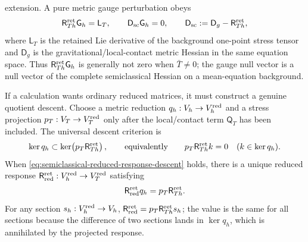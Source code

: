 \begin{controlledapproximation}
extension.  A pure metric gauge perturbation obeys
\begin{equation}
  \mathsf R^{\rm ret}_{Th}\mathsf G_h=\mathsf L_T,
  \qquad
  \mathsf D_{\rm sc}\mathsf G_h=0,
  \qquad
  \mathsf D_{\rm sc}:=\mathsf D_g-\mathsf R^{\rm ret}_{Th},
  \label{eq:semiclassical-typed-gauge-response}
\end{equation}
where \(\mathsf L_T\) is the retained Lie derivative of the background
one-point stress tensor and \(\mathsf D_g\) is the gravitational/local-contact
metric Hessian in the same equation space.  Thus
\(\mathsf R^{\rm ret}_{Th}\mathsf G_h\) is generally not zero when
\(\bar T\ne0\); the gauge null vector is a null vector of the complete
semiclassical Hessian on a mean-equation background.

If a calculation wants ordinary reduced matrices, it must construct a genuine
quotient descent.  Choose a metric reduction
\(q_h:V_h\to V_h^{\rm red}\) and a stress projection
\(p_T:V_T\to V_T^{\rm red}\) only after the local/contact term
\(\mathsf Q_T\) has been included.  The universal descent criterion is
\begin{equation}
  \ker q_h
  \subset
  \ker\!\left(p_T\mathsf R^{\rm ret}_{Th}\right),
  \qquad\text{equivalently}\qquad
  p_T\mathsf R^{\rm ret}_{Th}k=0
  \quad(k\in\ker q_h).
  \label{eq:semiclassical-reduced-response-descent}
\end{equation}
When \eqref{eq:semiclassical-reduced-response-descent} holds, there is a
unique reduced response
\(\mathsf R_{\rm red}^{\rm ret}:V_h^{\rm red}\to V_T^{\rm red}\) satisfying
\begin{equation}
  \mathsf R_{\rm red}^{\rm ret}q_h
  =
  p_T\mathsf R^{\rm ret}_{Th}.
  \label{eq:semiclassical-reduced-response-definition}
\end{equation}
For any section \(s_h:V_h^{\rm red}\to V_h\),
\(\mathsf R_{\rm red}^{\rm ret}=p_T\mathsf R^{\rm ret}_{Th}s_h\); the value is
the same for all sections because the difference of two sections lands in
\(\ker q_h\), which is annihilated by the projected response.


\end{controlledapproximation}
